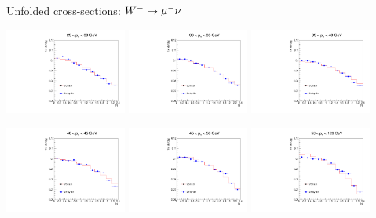 \begin{frame}{Unfolded cross-sections: $W^- \rightarrow \mu^- \nu$}
 \begin{center}
   \includegraphics[width=0.3\textwidth]{dates/20121219/figures/xsec/NEG/Wmn_Unf_2d_Slice_2.pdf}
   \includegraphics[width=0.3\textwidth]{dates/20121219/figures/xsec/NEG/Wmn_Unf_2d_Slice_3.pdf}
   \includegraphics[width=0.3\textwidth]{dates/20121219/figures/xsec/NEG/Wmn_Unf_2d_Slice_4.pdf}
 \end{center}
 \begin{center}
   \includegraphics[width=0.3\textwidth]{dates/20121219/figures/xsec/NEG/Wmn_Unf_2d_Slice_5.pdf}
   \includegraphics[width=0.3\textwidth]{dates/20121219/figures/xsec/NEG/Wmn_Unf_2d_Slice_6.pdf}
   \includegraphics[width=0.3\textwidth]{dates/20121219/figures/xsec/NEG/Wmn_Unf_2d_Slice_7.pdf}
 \end{center}
\end{frame}



